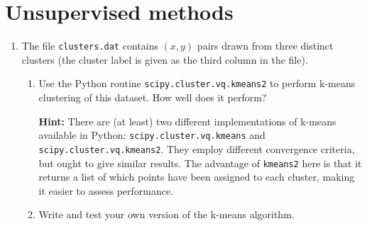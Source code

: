 \documentclass[a4paper,11pt]{article}
\newenvironment{hint}{
	\begin{mdframed}[backgroundcolor=gray!10,roundcorner=5pt]\textbf{Hint:} }{
	\end{mdframed}}
\begin{document}
\section{Unsupervised methods}
\begin{enumerate}[resume]
\item The file \texttt{clusters.dat} contains $(x,y)$ pairs drawn from three distinct clusters (the cluster label is given as the third column in the file).
\begin{enumerate}
\item Use the Python routine \texttt{scipy.cluster.vq.kmeans2} to perform k-means clustering of this dataset. How well does it perform? 
\begin{hint}
There are (at least) two different implementations of k-means available in Python: \texttt{scipy.cluster.vq.kmeans} and \texttt{scipy.cluster.vq.kmeans2}. They employ different  convergence criteria, but ought to give similar results. The advantage of \texttt{kmeans2} here is that it returns a list of which points have been assigned to each cluster, making it easier to assess performance.
\end{hint}
\item Write and test your own version of the k-means algorithm.
\end{enumerate}
\end{enumerate}
\end{document}

